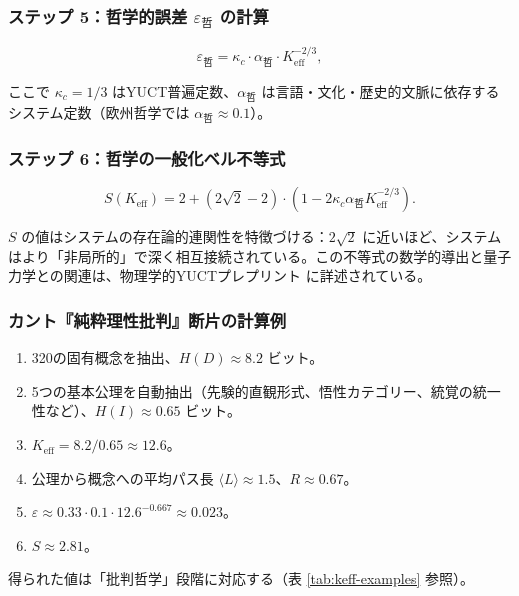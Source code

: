 \documentclass[11pt,a4paper]{article}
\newcommand{\kappac}{\kappa_c}
\newcommand{\eps}{\varepsilon}
\begin{document}
	\subsubsection{ステップ 5：哲学的誤差 \(\eps_{\text{哲}}\) の計算}
	
	\[
	\eps_{\text{哲}} = \kappac \cdot \alpha_{\text{哲}} \cdot K_{\mathrm{eff}}^{-2/3},
	\]
	
	ここで \(\kappac = 1/3\) はYUCT普遍定数、\(\alpha_{\text{哲}}\) は言語・文化・歴史的文脈に依存するシステム定数（欧州哲学では \(\alpha_{\text{哲}} \approx 0.1\)）。
	
	\subsubsection{ステップ 6：哲学の一般化ベル不等式}
	
	\[
	S(K_{\mathrm{eff}}) = 2 + (2\sqrt{2} - 2) \cdot \left(1 - 2\kappac \alpha_{\text{哲}} K_{\mathrm{eff}}^{-2/3}\right).
	\]
	
	\(S\) の値はシステムの存在論的連関性を特徴づける：\(2\sqrt{2}\) に近いほど、システムはより「非局所的」で深く相互接続されている。この不等式の数学的導出と量子力学との関連は、物理学的YUCTプレプリント \cite{Yakushev2026b} に詳述されている。
	
	\subsubsection{カント『純粋理性批判』断片の計算例}
	
	\begin{enumerate}
		\item 320の固有概念を抽出、\(H(D) \approx 8.2\) ビット。
		\item 5つの基本公理を自動抽出（先験的直観形式、悟性カテゴリー、統覚の統一性など）、\(H(I) \approx 0.65\) ビット。
		\item \(K_{\mathrm{eff}} = 8.2 / 0.65 \approx 12.6\)。
		\item 公理から概念への平均パス長 \(\langle L \rangle \approx 1.5\)、\(R \approx 0.67\)。
		\item \(\eps \approx 0.33 \cdot 0.1 \cdot 12.6^{-0.667} \approx 0.023\)。
		\item \(S \approx 2.81\)。
	\end{enumerate}
	
	得られた値は「批判哲学」段階に対応する（表 \ref{tab:keff-examples} 参照）。
	
	
\end{document}
